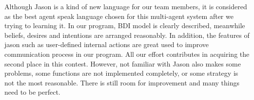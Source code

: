 \documentclass{llncs}
\begin{document}
Although Jason is a kind of new language for our team members, it is considered as the best agent speak language chosen for this multi-agent system after we trying to learning it. In our program, BDI model is clearly described, meanwhile beliefs, desires and intentions are arranged reasonably. In addition, the features of jason such as user-defined internal actions are great used to improve communication process in our program. All our effort contributes in acquiring the second place in this contest. However, not familiar with Jason also makes some problems, some functions are not implemented completely, or some strategy is not the most reasonable. There is still room for improvement and many things need to be perfect.

 



\clearpage

\end{document}
